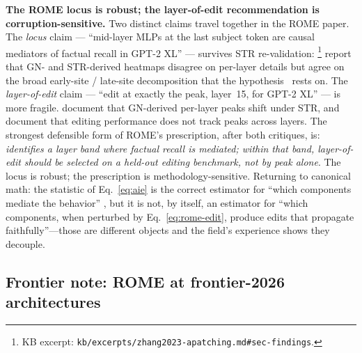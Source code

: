 \begin{contradiction}
\textbf{The ROME locus is robust; the layer-of-edit recommendation is
corruption-sensitive.} Two distinct claims travel together in the
ROME paper. The \emph{locus} claim --- ``mid-layer MLPs at the last
subject token are causal mediators of factual recall in GPT-2 XL''
--- survives STR re-validation: \citet[\S
3]{zhang2023-apatching}\footnote{KB excerpt:
\texttt{kb/excerpts/zhang2023-apatching.md\#sec-findings}.} report that
GN- and STR-derived heatmaps disagree on per-layer details but agree
on the broad early-site / late-site decomposition that the
hypothesis~\citep[\S 2.3]{meng2022-rome} rests on. The \emph{layer-of-edit}
claim --- ``edit at exactly the  peak, layer~15, for GPT-2 XL''
--- is more fragile. \citet[\S 1]{zhang2023-apatching} document that
GN-derived per-layer peaks shift under STR, and
document that editing performance does not track  peaks across
layers. The strongest defensible form of ROME's prescription, after
both critiques, is: \emph{ identifies a layer band where
factual recall is mediated; within that band, layer-of-edit should be
selected on a held-out editing benchmark, not by  peak alone}. The
locus is robust; the prescription is methodology-sensitive. Returning
to canonical math: the  statistic of Eq.~\eqref{eq:aie} is the
correct estimator for ``which components mediate the behavior''
\citep[\S 2.1]{zhang2023-apatching}, but it is not, by itself, an
estimator for ``which components, when perturbed by
Eq.~\eqref{eq:rome-edit}, produce edits that propagate
faithfully''---those are different objects and the field's experience
shows they decouple.
\end{contradiction}

\subsection{Frontier note: ROME at frontier-2026 architectures}
\label{sec:rome-frontier}

